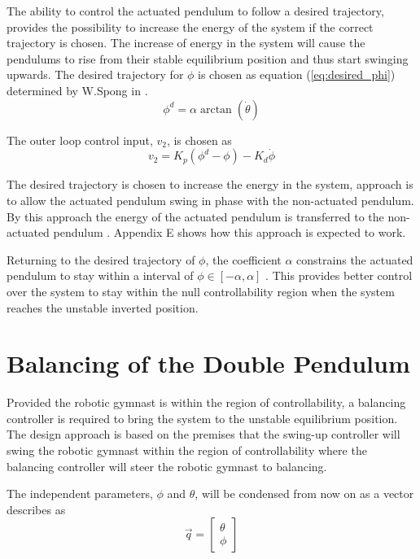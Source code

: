\documentclass[a4paper,12pt]{article}
\begin{document}
	The ability to control the actuated pendulum to follow a desired trajectory, provides the possibility to increase the energy of the system if the correct trajectory is chosen. The increase of energy in the system will cause the pendulums to rise from their stable equilibrium position and thus start swinging upwards. The desired trajectory for ${\phi}$ is chosen as equation (\ref{eq:desired_phi}) determined by W.Spong in \cite{spong_swingup}.
	\begin{equation} \label{eq:desired_phi}
	\phi^{d} =  \alpha \arctan(\dot{\theta})
	\end{equation}
	
	The outer loop control input, $v_{2}$, is chosen as 
	\begin{equation} \label{eq:v2}
	v_{2} = K_{p}(\phi^{d}-\phi)-K_{d}\dot{\phi}
	\end{equation}
	
	The desired trajectory is chosen to increase the energy in the system, approach is to allow the actuated pendulum swing in phase with the non-actuated pendulum. By this approach the energy of the actuated pendulum is transferred to the non-actuated pendulum \cite{spong_swingup}. Appendix E shows how this approach is expected to work.

	Returning to the desired trajectory of $\phi$, the coefficient $\alpha$ constrains the actuated pendulum to stay within a interval of $ \phi \in [-\alpha,\alpha] $ \cite{spong_swingup}. This provides better control over the system to stay within the null controllability region when the system reaches the unstable inverted position.
	
		  
	\section{Balancing of the Double Pendulum}
	
	Provided the robotic gymnast is within the region of controllability, a balancing controller is required to bring the system to the unstable equilibrium position. The design approach is based on the premises that the swing-up controller will swing the robotic gymnast within the region of controllability where the balancing controller will steer the robotic gymnast to balancing.
	
	The independent parameters, $\phi$ and $\theta$, will be condensed from now on as a vector describes as $$ \vec{q} = 
	\begin{bmatrix}
	\theta \\
	\phi
	\end{bmatrix}
	$$
	
\end{document}
